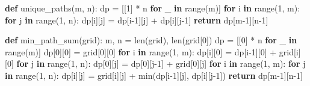 \documentclass[11pt]{article}
\newenvironment{Shaded}{\begin{snugshade}}{\end{snugshade}}
\newcommand{\BuiltInTok}[1]{\textcolor[rgb]{0.50,0.55,0.55}{#1}}
\newcommand{\ControlFlowTok}[1]{\textcolor[rgb]{0.99,0.74,0.29}{\textbf{#1}}}
\newcommand{\DecValTok}[1]{\textcolor[rgb]{0.96,0.45,0.00}{#1}}
\newcommand{\KeywordTok}[1]{\textcolor[rgb]{0.81,0.81,0.76}{\textbf{#1}}}
\newcommand{\NormalTok}[1]{\textcolor[rgb]{0.81,0.81,0.76}{#1}}
\newcommand{\OperatorTok}[1]{\textcolor[rgb]{0.81,0.81,0.76}{#1}}
\begin{document}
\begin{Shaded}
\begin{Highlighting}[]
\KeywordTok{def}\NormalTok{ unique\_paths(m, n):}
\NormalTok{    dp }\OperatorTok{=}\NormalTok{ [[}\DecValTok{1}\NormalTok{] }\OperatorTok{*}\NormalTok{ n }\ControlFlowTok{for}\NormalTok{ \_ }\KeywordTok{in} \BuiltInTok{range}\NormalTok{(m)]}
    \ControlFlowTok{for}\NormalTok{ i }\KeywordTok{in} \BuiltInTok{range}\NormalTok{(}\DecValTok{1}\NormalTok{, m):}
        \ControlFlowTok{for}\NormalTok{ j }\KeywordTok{in} \BuiltInTok{range}\NormalTok{(}\DecValTok{1}\NormalTok{, n):}
\NormalTok{            dp[i][j] }\OperatorTok{=}\NormalTok{ dp[i}\OperatorTok{{-}}\DecValTok{1}\NormalTok{][j] }\OperatorTok{+}\NormalTok{ dp[i][j}\OperatorTok{{-}}\DecValTok{1}\NormalTok{]}
    \ControlFlowTok{return}\NormalTok{ dp[m}\OperatorTok{{-}}\DecValTok{1}\NormalTok{][n}\OperatorTok{{-}}\DecValTok{1}\NormalTok{]}

\KeywordTok{def}\NormalTok{ min\_path\_sum(grid):}
\NormalTok{    m, n }\OperatorTok{=} \BuiltInTok{len}\NormalTok{(grid), }\BuiltInTok{len}\NormalTok{(grid[}\DecValTok{0}\NormalTok{])}
\NormalTok{    dp }\OperatorTok{=}\NormalTok{ [[}\DecValTok{0}\NormalTok{] }\OperatorTok{*}\NormalTok{ n }\ControlFlowTok{for}\NormalTok{ \_ }\KeywordTok{in} \BuiltInTok{range}\NormalTok{(m)]}
\NormalTok{    dp[}\DecValTok{0}\NormalTok{][}\DecValTok{0}\NormalTok{] }\OperatorTok{=}\NormalTok{ grid[}\DecValTok{0}\NormalTok{][}\DecValTok{0}\NormalTok{]}
    \ControlFlowTok{for}\NormalTok{ i }\KeywordTok{in} \BuiltInTok{range}\NormalTok{(}\DecValTok{1}\NormalTok{, m): dp[i][}\DecValTok{0}\NormalTok{] }\OperatorTok{=}\NormalTok{ dp[i}\OperatorTok{{-}}\DecValTok{1}\NormalTok{][}\DecValTok{0}\NormalTok{] }\OperatorTok{+}\NormalTok{ grid[i][}\DecValTok{0}\NormalTok{]}
    \ControlFlowTok{for}\NormalTok{ j }\KeywordTok{in} \BuiltInTok{range}\NormalTok{(}\DecValTok{1}\NormalTok{, n): dp[}\DecValTok{0}\NormalTok{][j] }\OperatorTok{=}\NormalTok{ dp[}\DecValTok{0}\NormalTok{][j}\OperatorTok{{-}}\DecValTok{1}\NormalTok{] }\OperatorTok{+}\NormalTok{ grid[}\DecValTok{0}\NormalTok{][j]}
    \ControlFlowTok{for}\NormalTok{ i }\KeywordTok{in} \BuiltInTok{range}\NormalTok{(}\DecValTok{1}\NormalTok{, m):}
        \ControlFlowTok{for}\NormalTok{ j }\KeywordTok{in} \BuiltInTok{range}\NormalTok{(}\DecValTok{1}\NormalTok{, n):}
\NormalTok{            dp[i][j] }\OperatorTok{=}\NormalTok{ grid[i][j] }\OperatorTok{+} \BuiltInTok{min}\NormalTok{(dp[i}\OperatorTok{{-}}\DecValTok{1}\NormalTok{][j], dp[i][j}\OperatorTok{{-}}\DecValTok{1}\NormalTok{])}
    \ControlFlowTok{return}\NormalTok{ dp[m}\OperatorTok{{-}}\DecValTok{1}\NormalTok{][n}\OperatorTok{{-}}\DecValTok{1}\NormalTok{]}
\end{Highlighting}
\end{Shaded}
\end{document}
